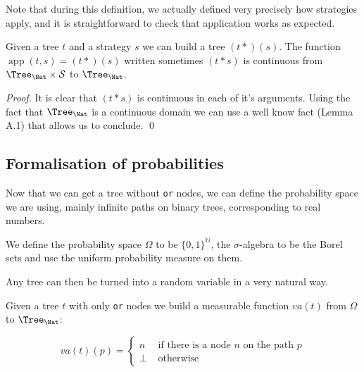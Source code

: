 Note that during this definition, we actually defined very precisely 
how strategies apply, and it is straightforward to check that 
application works as expected.

\begin{alemma}[Continuity]
    Given a tree $t$ and a strategy $s$ we can 
    build a tree $(t*) (s)$. The function 
    $\operatorname{app}(t,s) = (t*)(s)$ written sometimes
    $(t*s)$ 
    is continuous 
    from $\Tree_\Nat \times \mathcal{S}$ to $\Tree_\Nat$.
\end{alemma}

\begin{proof}
    It is clear that $(t*s)$ is continuous in each of it's 
    arguments. Using the fact that $\Tree_\Nat$ is a 
    continuous domain we can use a well know fact 
    \cite{battenfeld2009two} (Lemma A.1) that allows us to conclude.
    \qed
\end{proof}


\subsection{Formalisation of probabilities}

Now that we can get a tree without \texttt{or} nodes,
we can define the probability space we are using, mainly 
infinite paths on binary trees, corresponding to real numbers.

\begin{adefinition}
    We define the probability space $\Omega$
    to be $\{0,1\}^\mathbb{N}$, the 
    $\sigma$-algebra to be the Borel sets 
    and use the uniform probability measure on them.
\end{adefinition}

Any tree can then be turned into a random variable in 
a very natural way. 

\begin{adefinition}
    Given a tree $t$ with only \texttt{or} nodes we 
    build a measurable function $va(t)$ from $\Omega$ to $\Tree_\Nat$:

    \begin{equation*}
        va(t)(p) = \begin{cases}
            n  & \text{ if there is a node } n \text{ on the path } p \\
            \bot & \text{ otherwise } 
        \end{cases}
    \end{equation*}
\end{adefinition}

